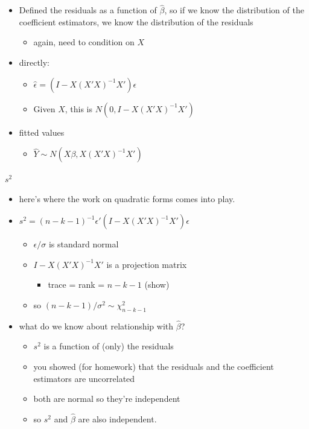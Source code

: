\begin{itemize}
\item Defined the residuals as a function of $\hat\beta$, so if we
        know the distribution of the coefficient estimators, we know the
        distribution of the residuals
\begin{itemize}
\item again, need to condition on $X$
\end{itemize}
\item directly:
\begin{itemize}
\item $\hat\epsilon = (I - X(X'X)^{-1}X') \epsilon$
\item Given $X$, this is $N(0, I - X(X'X)^{-1}X')$
\end{itemize}
\item fitted values
\begin{itemize}
\item $\hat Y \sim N(X\beta, X(X'X)^{-1}X')$
\end{itemize}
\end{itemize}
\paragraph{$s^2$}
\label{sec-3-3-3}

\begin{itemize}
\item here's where the work on quadratic forms comes into play.
\item $s^2 = (n-k-1)^{-1} \epsilon' (I - X(X'X)^{-1}X') \epsilon$
\begin{itemize}
\item $\epsilon/\sigma$ is standard normal
\item $I - X(X'X)^{-1}X'$ is a projection matrix
\begin{itemize}
\item trace = rank = $n - k - 1$ (show)
\end{itemize}
\item so $(n-k-1)/\sigma^2 \sim \chi^2_{n-k-1}$
\end{itemize}
\item what do we know about relationship with $\hat\beta$?
\begin{itemize}
\item $s^2$ is a function of (only) the residuals
\item you showed (for homework) that the residuals and the
          coefficient estimators are uncorrelated
\item both are normal so they're independent
\item so $s^2$ and $\hat\beta$ are also independent.
\end{itemize}
\end{itemize}
